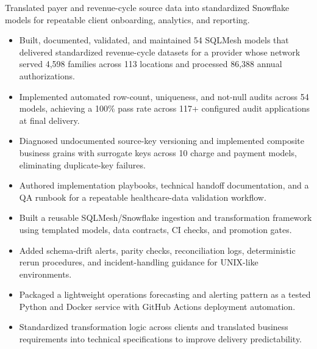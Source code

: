 Translated payer and revenue-cycle source data into standardized Snowflake models for repeatable client onboarding, analytics, and reporting.
\begin{itemize}
  \item Built, documented, validated, and maintained 54 SQLMesh models that delivered standardized revenue-cycle datasets for a provider whose network served 4,598 families across 113 locations and processed 86,388 annual authorizations.
  \item Implemented automated row-count, uniqueness, and not-null audits across 54 models, achieving a 100\% pass rate across 117+ configured audit applications at final delivery.
  \item Diagnosed undocumented source-key versioning and implemented composite business grains with surrogate keys across 10 charge and payment models, eliminating duplicate-key failures.
  \item Authored implementation playbooks, technical handoff documentation, and a QA runbook for a repeatable healthcare-data validation workflow.
  \item Built a reusable SQLMesh/Snowflake ingestion and transformation framework using templated models, data contracts, CI checks, and promotion gates.
  \item Added schema-drift alerts, parity checks, reconciliation logs, deterministic rerun procedures, and incident-handling guidance for UNIX-like environments.
  \item Packaged a lightweight operations forecasting and alerting pattern as a tested Python and Docker service with GitHub Actions deployment automation.
  \item Standardized transformation logic across clients and translated business requirements into technical specifications to improve delivery predictability.
\end{itemize}


